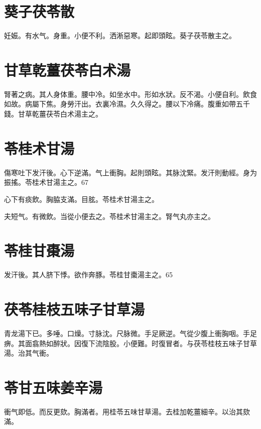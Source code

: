 \documentclass[12pt,twoside,UTF8,b5paper]{ctexbook}
\begin{document}
\section{葵子茯苓散}

妊娠。有水气。身重。小便不利。洒淅惡寒。起即頭眩。葵子茯苓散主之。

\section{甘草乾薑茯苓白术湯}

腎著之病。其人身体重。腰中冷。如坐水中。形如水狀。反不渴。小便自利。飲食如故。病屬下焦。身勞汗出。衣裏冷濕。久久得之。腰以下冷痛。腹重如帶五千錢。甘{草乾}薑{茯}苓{白}术湯主之。

\section{苓桂术甘湯}

傷寒吐下发汗後。心下逆滿。气上衝胸。起則頭眩。其脉沈緊。发汗則動經。身为振搖。苓桂术甘湯主之。67

心下有痰飲。胸脇支滿。目胘。苓桂术甘湯主之。

夫短气。有微飲。当從小便去之。苓桂术甘湯主之。腎气丸亦主之。

\section{苓桂甘棗湯}

发汗後。其人脐下悸。欲作奔豚。苓桂甘棗湯主之。65

\section{茯苓桂枝五味子甘草湯}

青龙湯下已。多唾。口燥。寸脉沈。尺脉微。手足厥逆。气從少腹上衝胸咽。手足痹。其面翕熱如醉狀。因復下流陰股。小便難。时復冒者。与茯苓桂枝五味子甘草湯。治其气衝。

\section{苓甘五味姜辛湯}

衝气即低。而反更欬。胸滿者。用桂苓五味甘草湯。去桂加乾薑細辛。以治其欬滿。

\section{}
\end{document}
